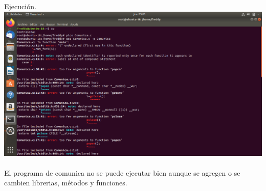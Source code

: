 \documentclass[11pt,a4paper]{report}
\begin{document}
Ejecuci\'on.\\
\includegraphics[scale=.35]{comunica.png} 
\\
\\
El programa de comunica no se puede ejecutar bien aunque se agregen o se cambien librerias, m\'etodos y funciones.\\

\clearpage
\end{document}
